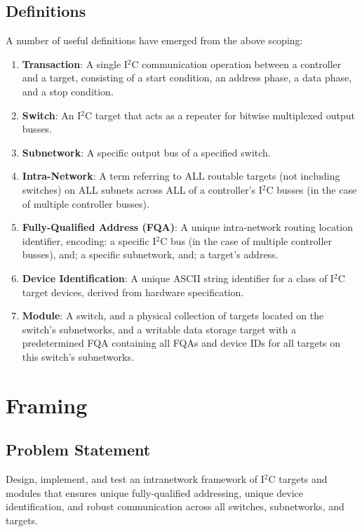 \documentclass{../tex/report}
\begin{document}
\subsection{Definitions}\label{sec:definitions}

A number of useful definitions have emerged from the above scoping:
\begin{enumerate}
    \item \textbf{Transaction}: A single I$^2$C communication operation between a controller and a target, consisting of a start condition, an address phase, a data phase, and a stop condition.
    \item \textbf{Switch}: An I${}^2$C target that acts as a repeater for bitwise multiplexed output busses.
    \item \textbf{Subnetwork}: A specific output bus of a specified switch.
    \item \textbf{Intra-Network}: A term referring to ALL routable targets (not including switches) on ALL subnets across ALL of a controller's I${}^2$C busses (in the case of multiple controller busses).
    \item \textbf{Fully-Qualified Address (FQA)}: A unique intra-network routing location identifier, encoding: a specific I${}^2$C bus (in the case of multiple controller busses), and; a specific subnetwork, and; a target's address.
    \item \textbf{Device Identification}: A unique ASCII string identifier for a class of I${}^2$C target devices, derived from hardware specification.
    \item \textbf{Module}: A switch, and a physical collection of targets located on the switch's subnetworks, and a writable data storage target with a predetermined FQA containing all FQAs and device IDs for all targets on this switch's subnetworks.
\end{enumerate}

\clearpage


\section{Framing}\label{sec:framing}

\subsection{Problem Statement}\label{sec:opportunity}

\hspace{24pt} Design, implement, and test an intranetwork framework of I$^2$C targets and modules that ensures unique fully-qualified addressing, unique device identification, and robust communication across all switches, subnetworks, and targets.
\end{document}
